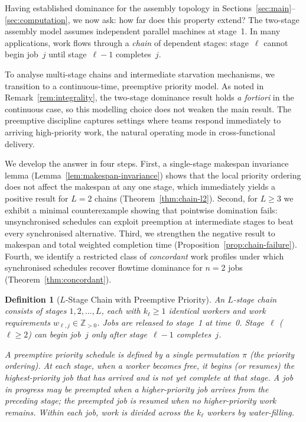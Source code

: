 \documentclass[11pt,titlepage]{article}
\newtheorem{definition}[theorem]{Definition}
\begin{document}
Having established dominance for the assembly topology in
Sections~\ref{sec:main}--\ref{sec:computation}, we now ask:
how far does this property extend? The two-stage assembly model
assumes independent parallel machines at stage~1. In many
applications, work flows through a \emph{chain} of dependent
stages: stage~$\ell$ cannot begin job~$j$ until
stage~$\ell{-}1$ completes~$j$.

To analyse multi-stage chains and intermediate starvation
mechanisms, we transition to a continuous-time, preemptive
priority model.  As noted in Remark~\ref{rem:integrality},
the two-stage dominance result holds \emph{a fortiori} in
the continuous case, so this modelling choice does not weaken
the main result.  The preemptive discipline captures settings
where teams respond immediately to arriving high-priority work,
the natural operating mode in cross-functional delivery.

We develop the answer in four steps. First, a single-stage
makespan invariance lemma (Lemma~\ref{lem:makespan-invariance})
shows that the local priority ordering does not affect the
makespan at any one stage, which immediately yields a positive
result for $L = 2$ chains (Theorem~\ref{thm:chain-l2}). Second,
for $L \geq 3$ we exhibit a minimal counterexample showing that
pointwise domination fails: unsynchronised schedules can exploit
preemption at intermediate stages to beat every synchronised
alternative. Third, we strengthen the negative result to
makespan and total weighted completion time
(Proposition~\ref{prop:chain-failure}). Fourth, we identify a
restricted class of \emph{concordant} work profiles under which
synchronised schedules recover flowtime dominance for $n = 2$
jobs (Theorem~\ref{thm:concordant}).

\begin{definition}[$L$-Stage Chain with Preemptive Priority]
\label{def:chain}
An $L$-stage chain consists of stages $1, 2, \ldots, L$, each
with $k_\ell \geq 1$ identical workers and work requirements
$w_{\ell,j} \in \mathbb{Z}_{> 0}$. Jobs are released to
stage~1 at time~0. Stage~$\ell$ ($\ell \geq 2$) can begin
job~$j$ only after stage~$\ell{-}1$ completes~$j$.

A \emph{preemptive priority schedule} is defined by a single
permutation $\pi$ (the priority ordering). At each stage,
when a worker becomes free, it begins (or resumes) the
highest-priority job that has arrived and is not yet complete
at that stage. A job in progress may be preempted when a
higher-priority job arrives from the preceding stage; the
preempted job is resumed when no higher-priority work
remains. Within each job, work is divided across the
$k_\ell$ workers by water-filling.
\end{definition}
\end{document}
